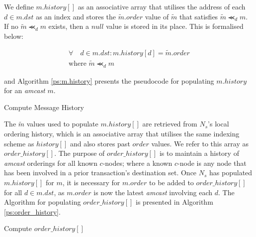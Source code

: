 \begin{enumerate}
         We define $m.history[]$ as an associative array that utilises the address of each $d \in m.dst$ as an index and stores the $\tilde{m}.order$ value of $\tilde{m}$ that satisfies $\tilde{m} \llcurly_d m$.  If no $\tilde{m} \llcurly_d m$ exists, then a $null$ value is stored in its place.  This is formalised below:
         
         \begin{equation*}
             \begin{split}
	             \forall \quad d \in m.dst : m.history[d] = \tilde{m}.order \\
	             \text{where } \tilde{m} \llcurly_d m
             \end{split}
         \end{equation*}
         
        and Algorithm \ref{ps:m.history} presents the pseudocode for populating $m.history$ for an \emph{amcast} $m$.  
        
      \begin{algorithm}
       \caption{Compute Message History}
        \label{ps:m.history}
        \begin{algorithmic}[1]
                \ELSE
                \ENDIF
            \ENDFOR
        \end{algorithmic}
    \end{algorithm}
         
        The $\tilde{m}$ values used to populate $m.history[]$ are retrieved from $N_s$'s local ordering history, which is an associative array that utilises the same indexing scheme as $history[]$ and also stores past $order$ values.  We refer to this array as $order\_history[]$.  The purpose of $order\_history[]$ is to maintain a history of \emph{amcast} orderings for all known $c$-nodes; where a known $c$-node is any node that has been involved in a prior transaction's destination set.  Once $N_s$ has populated $m.history[]$ for $m$, it is necessary for $m.order$ to be added to $order\_history[]$ for all $d \in m.dst$, as $m.order$ is now the latest \emph{amcast} involving each $d$.  The Algorithm for populating $order\_history[]$ is presented in Algorithm \ref{ps:order_history}.  
		        
    \begin{algorithm}[h]
       \caption{Compute $order\_history[]$}
        \label{ps:order_history}
        \begin{algorithmic}[1]
                \ENDIF
            \ENDFOR
        \end{algorithmic}
    \end{algorithm}           		        
		        

\end{enumerate}
